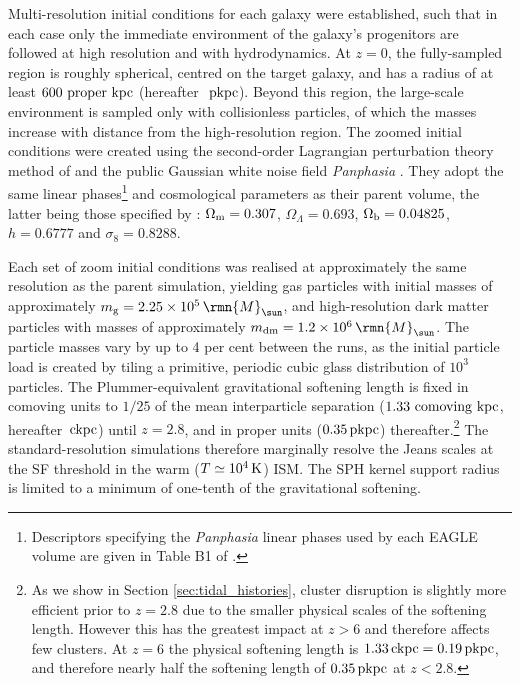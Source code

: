 \documentclass[fleqn,usenatbib]{mnras}
\newcommand\Msun{\,\rmn{M}_{\sun}}
\newcommand{\K}              {\,{\rm K}}
\newcommand{\pkpc}                      {\,{\rm pkpc}}
\newcommand{\ckpc}                      {\,{\rm ckpc}}
\begin{document}
Multi-resolution initial conditions for each galaxy were established, such that in each case only the immediate environment of the galaxy's progenitors are followed at high resolution and with hydrodynamics. At $z=0$, the fully-sampled region is roughly spherical, centred on the target galaxy, and has a radius of at least $600~{\rm proper~kpc}$ (hereafter~$\pkpc$). Beyond this region, the large-scale environment is sampled only with collisionless particles, of which the masses increase with distance from the high-resolution region. The zoomed initial conditions were created using the second-order Lagrangian perturbation theory method of \citet{Jenkins_10} and the public Gaussian white noise field \textit{Panphasia} \citep{Jenkins_13}. They adopt the same linear phases\footnote{Descriptors specifying the \textit{Panphasia} linear phases used by each EAGLE volume are given in Table B1 of .} and cosmological parameters as their parent volume, the latter being those specified by \citet{Planck_2014_paperI_short}: $\Omega_{\rm m} =  0.307$, $\Omega_\Lambda = 0.693$, $\Omega_{\rm b} = 0.04825$, $h = 0.6777$ and  $\sigma_8 =  0.8288$. 

Each set of zoom initial conditions was realised at approximately the same resolution as the parent simulation, yielding gas particles with initial masses of approximately $m_{\rm g}=2.25 \times 10^5\Msun$, and high-resolution dark matter particles with masses of approximately $m_{\rm dm}=1.2 \times 10^6\Msun$. The particle masses vary by up to 4 per cent between the runs, as the initial particle load is created by tiling a primitive, periodic cubic glass distribution of $10^3$ particles. The Plummer-equivalent gravitational softening length is fixed in comoving units to $1/25$ of the mean interparticle separation ($1.33~{\rm comoving~kpc}$, hereafter $\ckpc$) until $z=2.8$, and in proper units ($0.35 \pkpc$) thereafter.\footnote{As we show in Section \ref{sec:tidal_histories}, cluster disruption is slightly more efficient prior to $z=2.8$ due to the smaller physical scales of the softening length. However this has the greatest impact at $z>6$ and therefore affects few clusters. At $z=6$ the physical softening length is $1.33 \ckpc = 0.19 \pkpc$, and therefore nearly half the softening length of $0.35 \pkpc$ at $z<2.8$.}
The standard-resolution simulations therefore marginally resolve the Jeans scales at the SF threshold in the warm ($T\simeq 10^4\K$) ISM. The SPH kernel support radius is limited to a minimum of one-tenth of the gravitational softening.
\end{document}
